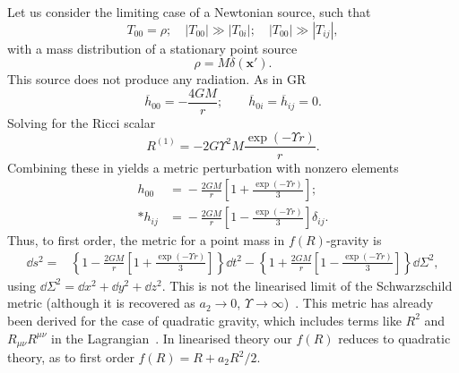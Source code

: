 Let us consider the limiting case of a Newtonian source, such that
\begin{equation}
T_{00} = \rho; \quad |T_{00}| \gg |T_{0i}|; \quad |T_{00}| \gg |T_{ij}|,
\end{equation}
with a mass distribution of a stationary point source
\begin{equation}
\rho = M\delta(\boldsymbol{x'}).
\end{equation}
This source does not produce any radiation. As in GR
\begin{equation}
\overline{h}_{00} = -\frac{4GM}{r}; \qquad \overline{h}_{0i} = \overline{h}_{ij} = 0.
\end{equation}
Solving for the Ricci scalar
\begin{equation}
R^{(1)} = -2 G \Upsilon^2 M \frac{\exp(- \Upsilon r)}{r}.
\end{equation}
Combining these in  yields a metric perturbation with nonzero elements 
\begin{equation}
\begin{split}
h_{00} & = {} -\frac{2GM}{r}\left[1 + \frac{\exp(- \Upsilon r)}{3}\right]; \\*
h_{ij} & = {} -\frac{2GM}{r}\left[1 - \frac{\exp(- \Upsilon r)}{3}\right]\delta_{ij}.
\end{split}
\end{equation}
Thus, to first order, the metric for a point mass in $f(R)$-gravity is~\cite{Capozziello2007, Capozziello2009a, Naf2010}
\begin{align}
\dd s^2 = {} & \left\{1-\frac{2GM}{r}\left[1 + \frac{\exp(- \Upsilon r)}{3}\right]\right\}\dd t^2 - \left\{1+\frac{2GM}{r}\left[1 - \frac{\exp(- \Upsilon r)}{3}\right]\right\}\dd \Sigma^2,
\label{eq:f(R)_Schw}
\end{align}
using $\dd \Sigma^2 = \dd x^2 + \dd y^2 + \dd z^2$. This is not the linearised limit of the Schwarzschild metric (although it is recovered as $a_2 \rightarrow 0$, $\Upsilon \rightarrow \infty$)~\cite{Chiba2007a}. This metric has already been derived for the case of quadratic gravity, which includes terms like $R^2$ and $R_{\mu\nu}R^{\mu\nu}$ in the Lagrangian~\cite{Pechlaner1966, Stelle1978, Schmidt1986, Teyssandier1990}. In linearised theory our $f(R)$ reduces to quadratic theory, as to first order $f(R) = R + a_2 R^2/2$.

